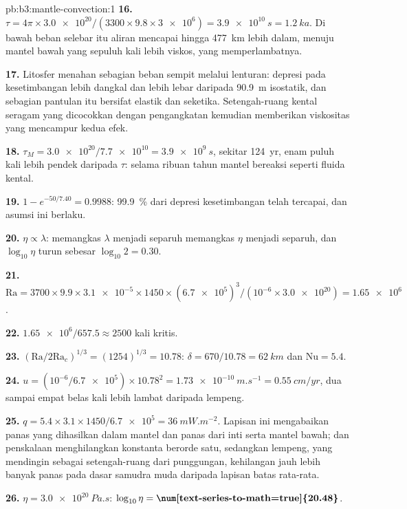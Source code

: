 \begin{solution}{pb:b3:mantle-convection:1}
\textbf{16.} $\tau = 4\pi\times\num{3.0e20}/(3300\times9.8\times\num{3e6}) =
\qty{3.9e10}{s} = \qty{1.2}{ka}$. Di bawah beban selebar itu aliran mencapai
hingga \qty{477}{km} lebih dalam, menuju mantel bawah yang sepuluh kali lebih viskos,
yang memperlambatnya.

\textbf{17.} Litosfer menahan sebagian beban sempit melalui lenturan: depresi pada
kesetimbangan lebih dangkal dan lebih lebar daripada \qty{90.9}{m} isostatik, dan sebagian
pantulan itu bersifat elastik dan seketika. Setengah-ruang kental seragam yang dicocokkan dengan
pengangkatan kemudian memberikan viskositas yang mencampur kedua efek.

\textbf{18.} $\tau_M = \num{3.0e20}/\num{7.7e10} = \qty{3.9e9}{s}$, sekitar
\qty{124}{yr}, enam puluh kali lebih pendek daripada $\tau$: selama ribuan tahun
mantel bereaksi seperti fluida kental.

\textbf{19.} $1 - e^{-50/7.40} = 0.9988$: \qty{99.9}{\percent} dari
depresi kesetimbangan telah tercapai, dan asumsi ini berlaku.

\textbf{20.} $\eta \propto \lambda$: memangkas $\lambda$ menjadi separuh memangkas $\eta$ menjadi separuh, dan
$\log_{10}\eta$ turun sebesar $\log_{10}2 = 0.30$.

\textbf{21.} $\mathrm{Ra} = 3700\times9.9\times\num{3.1e-5}\times1450\times
(\num{6.7e5})^3/(10^{-6}\times\num{3.0e20}) = \num{1.65e6}$.

\textbf{22.} $\num{1.65e6}/657.5 \approx 2500$ kali kritis.

\textbf{23.} $(\mathrm{Ra}/2\mathrm{Ra}_c)^{1/3} = (1254)^{1/3} = 10.78$: $\delta
= 670/10.78 = \qty{62}{km}$ dan $\mathrm{Nu} = 5.4$.

\textbf{24.} $u = (10^{-6}/\num{6.7e5})\times10.78^2 = \qty{1.73e-10}{m.s^{-1}}
= \qty{0.55}{cm/yr}$, dua sampai empat belas kali lebih lambat daripada lempeng.

\textbf{25.} $q = 5.4\times3.1\times1450/\num{6.7e5} = \qty{36}{mW.m^{-2}}$. Lapisan
ini mengabaikan panas yang dihasilkan dalam mantel dan panas dari
inti serta mantel bawah; dan penskalaan menghilangkan konstanta berorde satu,
sedangkan lempeng, yang mendingin sebagai setengah-ruang dari punggungan, kehilangan jauh lebih banyak panas pada
dasar samudra muda daripada lapisan batas rata-rata.

\textbf{26.} $\eta = \qty{3.0e20}{Pa.s}$: $\log_{10}\eta =
\textbf{\num[text-series-to-math=true]{20.48}}$.
\end{solution}
